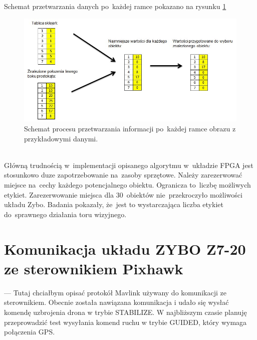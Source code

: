Schemat przetwarzania danych po~każdej ramce pokazano na rysunku \ref{fig:ind_schemat}
\begin{figure}[h]
	\centering
	\includegraphics[width=\textwidth]{ind_schemat.jpg}
	\caption{Schemat procesu przetwarzania informacji po~każdej ramce obrazu z przykładowymi danymi.}
	\label{fig:ind_schemat}
\end{figure}
\\Główną trudnością w~implementacji opisanego algorytmu w~układzie FPGA jest stosunkowo duze zapotrzebowanie na~zasoby sprzętowe. Należy zarezerwować miejsce na~cechy każdego potencjalnego obiektu. Ogranicza to~liczbę możliwych etykiet. Zarezerwowanie miejsca dla 30~obiektów nie~przekroczyło możliwości układu Zybo. Badania pokazały, że~jest to wystarczająca liczba etykiet do~sprawnego działania toru wizyjnego.
\section{Komunikacja układu ZYBO Z7-20 ze sterownikiem Pixhawk}
\label{sec:komunikacja_pixhawk} 
--- Tutaj chciałbym opisać protokół Mavlink używany do komunikacji ze sterownikiem. Obecnie została nawiązana komunikacja i udało się wysłać komendę uzbrojenia drona w trybie STABILIZE. W najbliższym czasie planuję przeprowadzić test wysyłania komend ruchu w trybie GUIDED, który wymaga połączenia GPS.
